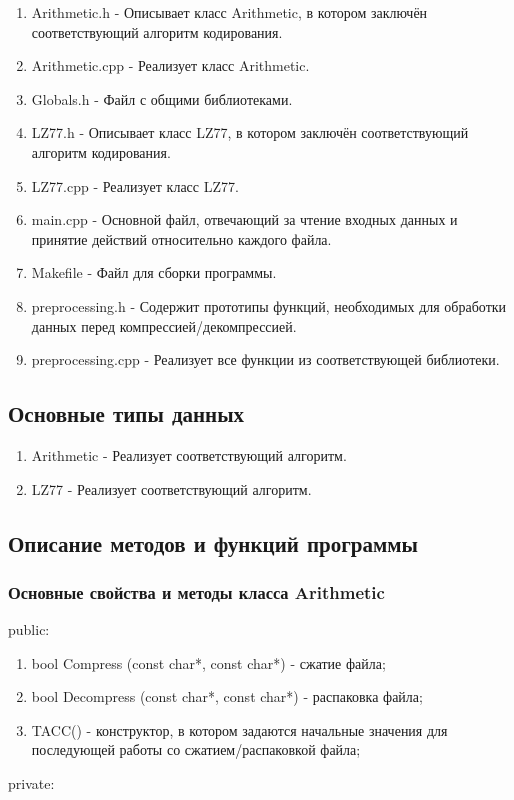 \documentclass[12pt]{article}
\begin{document}
\begin{enumerate}
	\item Arithmetic.h - Описывает класс Arithmetic, в котором заключён соответствующий алгоритм кодирования. 
	\item Arithmetic.cpp - Реализует класс Arithmetic.
	\item Globals.h - Файл с общими библиотеками.
	\item LZ77.h - Описывает класс LZ77, в котором заключён соответствующий алгоритм кодирования.
	\item LZ77.cpp - Реализует класс LZ77.
	\item main.cpp - Основной файл, отвечающий за чтение входных данных и принятие действий относительно каждого файла.
	\item Makefile - Файл для сборки программы.
	\item preprocessing.h - Содержит прототипы функций, необходимых для обработки данных перед компрессией/декомпрессией.
	\item preprocessing.cpp - Реализует все функции из соответствующей библиотеки.
\end{enumerate}

\subsection*{Основные типы данных}

\begin{enumerate}
	\item Arithmetic - Реализует соответствующий алгоритм.
	\item LZ77 - Реализует соответствующий алгоритм.
\end{enumerate}

\subsection*{Описание методов и функций программы}
 
\subsubsection*{Основные свойства и методы класса Arithmetic}%
\noindent
public:

\begin{enumerate}
	\item bool Compress (const char*, const char*) - сжатие файла;
	\item bool Decompress (const char*, const char*) - распаковка файла;
	\item TACC() - конструктор, в котором задаются начальные значения для последующей работы со сжатием/распаковкой файла;
\end{enumerate}
\noindent
private:
\end{document}
